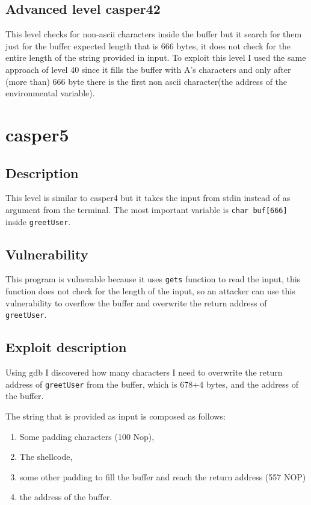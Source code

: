 \documentclass[a4paper,12pt]{article}
\begin{document}
\subsection{Advanced level casper42}

This level checks for non-ascii characters inside the buffer but it search for them just for the buffer expected length that is 666 bytes, it does not check for the entire length of the string provided in input. To exploit this level I used the same approach of level 40 since it fills the buffer with A's characters and only after (more than) 666 byte there is the first non ascii character(the address of the environmental variable).

\section{casper5}

\subsection{Description}
This level is similar to casper4 but it takes the input from stdin instead of as argument from the terminal.
The most important variable is \texttt{char buf[666]} inside \texttt{greetUser}.


\subsection{Vulnerability}
This program is vulnerable because it uses \texttt{gets} function to read the input, this function does not check for the length of the input, so an attacker can use this vulnerability to overflow the buffer and overwrite the return address of \texttt{greetUser}.


\subsection{Exploit description}
Using gdb I discovered how many characters I need to overwrite the return address of \texttt{greetUser} from the buffer, which is 678+4 bytes, and the address of the buffer.

The string that is provided as input is composed as follows:
\begin{enumerate}
\item Some padding characters (100 Nop),
\item The shellcode,
\item some other padding to fill the buffer and reach the return address (557 NOP)
\item the address of the buffer.
\end{enumerate}
\end{document}
